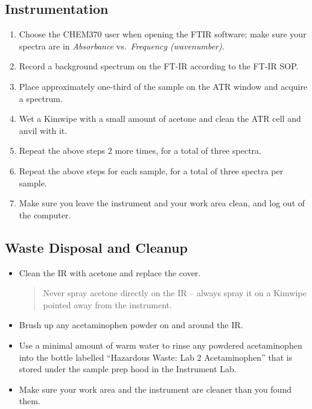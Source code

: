 \documentclass[]{tufte-book}
\providecommand{\tightlist}{%
  \setlength{\itemsep}{0pt}\setlength{\parskip}{0pt}}
\begin{document}
\hypertarget{instrumentation-2}{%
\subsection{Instrumentation}\label{instrumentation-2}}

\begin{enumerate}
\def\labelenumi{\arabic{enumi}.}
\tightlist
\item
  Choose the CHEM370 user when opening the FTIR software; make sure your spectra are in \emph{Absorbance} vs.~\emph{Frequency (wavenumber)}.
\item
  Record a background spectrum on the FT-IR according to the FT-IR SOP.
\item
  Place approximately one-third of the sample on the ATR window and acquire a spectrum.
\item
  Wet a Kimwipe with a small amount of acetone and clean the ATR cell and anvil with it.
\item
  Repeat the above steps 2 more times, for a total of three spectra.
\item
  Repeat the above steps for each sample, for a total of three spectra per sample.
\item
  Make sure you leave the instrument and your work area clean, and log out of the computer.
\end{enumerate}

\hypertarget{waste-disposal-and-cleanup-5}{%
\subsection{Waste Disposal and Cleanup}\label{waste-disposal-and-cleanup-5}}

\begin{itemize}
\item
  Clean the IR with acetone and replace the cover.

  \begin{quote}
  Never spray acetone directly on the IR -- always spray it on a Kimwipe pointed away from the instrument.
  \end{quote}
\item
  Brush up any acetaminophen powder on and around the IR.
\item
  Use a minimal amount of warm water to rinse any powdered acetaminophen into the bottle labelled ``Hazardous Waste: Lab 2 Acetaminophen'' that is stored under the sample prep hood in the Instrument Lab.
\item
  Make sure your work area and the instrument are cleaner than you found them.
\end{itemize}
\end{document}
